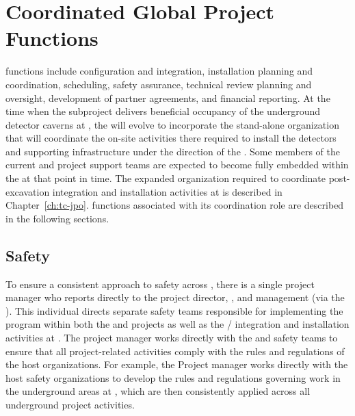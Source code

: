 \section{Coordinated Global Project Functions}
\label{sec:global_project}

 functions include  configuration and 
integration, installation planning and coordination, scheduling, 
safety assurance, technical review planning and oversight, development of partner agreements, and financial reporting.  At 
the time when the   subproject delivers 
beneficial occupancy of the underground detector caverns at 
, the  will evolve to incorporate the 
stand-alone organization that will coordinate the 
on-site activities there required to install the detectors and 
supporting infrastructure under the direction of the .  
Some members of the current  and  project 
support teams are expected to become fully embedded within the 
 at that point in time.  The expanded  
organization required to coordinate post-excavation integration 
and installation activities at  is described in 
Chapter~\ref{ch:tc-jpo}.   functions associated with 
its  coordination role are described in the 
following sections.

\subsection{Safety}
\label{sec:dune_safety}

To ensure a consistent approach to safety across ,
there is a single project  manager who reports directly 
to the  project director, , and 
management (via the  ).  This individual
directs separate safety teams responsible for implementing the 
  program within both the  
and  projects as well as the /
integration and installation activities at .  The 
project  manager works directly with the  
and  safety teams to ensure that all project-related 
activities comply with the rules and regulations of the host 
organizations.  For example, the Project  manager 
works directly with the host safety organizations to develop the 
rules and regulations governing work in the underground areas 
at , which are then consistently applied across all 
underground project activities.

